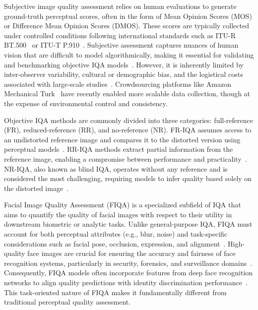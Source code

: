 Subjective image quality assessment relies on human evaluations to generate ground-truth perceptual scores, often in the form of Mean Opinion Scores (MOS) or Difference Mean Opinion Scores (DMOS). These scores are typically collected under controlled conditions following international standards such as ITU-R BT.500~\cite{itu_bt500_2023} or ITU-T P.910~\cite{itu_p910_2008}. Subjective assessment captures nuances of human vision that are difficult to model algorithmically, making it essential for validating and benchmarking objective IQA models~\cite{ponomarenko_tid2013, zaric_comparison_objective_subjective}. However, it is inherently limited by inter-observer variability, cultural or demographic bias, and the logistical costs associated with large-scale studies~\cite{ghadiyaram_crowdsourced_study_2016}. Crowdsourcing platforms like Amazon Mechanical Turk~\cite{amazon_mturk} have recently enabled more scalable data collection, though at the expense of environmental control and consistency.


Objective IQA methods are commonly divided into three categories: full-reference (FR), reduced-reference (RR), and no-reference (NR). FR-IQA assumes access to an undistorted reference image and compares it to the distorted version using perceptual models~\cite{wang_ssim_2004, sheikh_ifc_2005, zhang_fsim_2011}. RR-IQA methods extract partial information from the reference image, enabling a compromise between performance and practicality~\cite{wang_wavelet_statistics_2005, li_divisive_normalization_2009}. NR-IQA, also known as blind IQA, operates without any reference and is considered the most challenging, requiring models to infer quality based solely on the distorted image~\cite{mittal_brisque_2012, bosse_deep_nriqa_2018}.


Facial Image Quality Assessment (FIQA) is a specialized subfield of IQA that aims to quantify the quality of facial images with respect to their utility in downstream biometric or analytic tasks. Unlike general-purpose IQA, FIQA must account for both perceptual attributes (e.g., blur, noise) and task-specific considerations such as facial pose, occlusion, expression, and alignment~\cite{hernandez_fiqanet_2020, boutros_iqface_2021, li_biofacenet_2021}. High-quality face images are crucial for ensuring the accuracy and fairness of face recognition systems, particularly in security, forensics, and surveillance domains~\cite{xu_secureqnet_2020, luo_deepiq_2018}. Consequently, FIQA models often incorporate features from deep face recognition networks to align quality predictions with identity discrimination performance~\cite{FaceMetric2025}. This task-oriented nature of FIQA makes it fundamentally different from traditional perceptual quality assessment.

